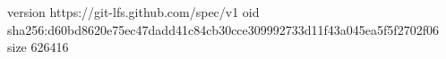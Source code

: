version https://git-lfs.github.com/spec/v1
oid sha256:d60bd8620e75ec47dadd41c84cb30cce309992733d11f43a045ea5f5f2702f06
size 626416
